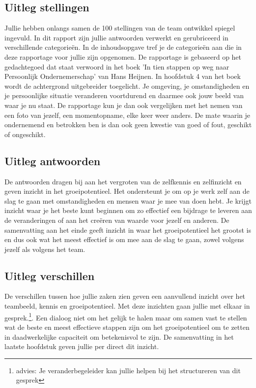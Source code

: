 \subsection{Uitleg stellingen}
Jullie hebben onlangs samen de 100 stellingen van de team ontwikkel spiegel ingevuld. In dit rapport zijn jullie antwoorden verwerkt en gerubriceerd in verschillende categorie\"en. In de inhoudsopgave tref je de categorie\"en aan die in deze rapportage voor jullie zijn opgenomen. De rapportage is gebaseerd op het gedachtegoed dat staat verwoord in het boek 'In tien stappen op weg naar Persoonlijk Ondernemerschap' van Hans Heijnen. In hoofdstuk 4 van het boek wordt de achtergrond uitgebreider toegelicht. Je omgeving, je omstandigheden en je persoonlijke situatie veranderen voortdurend en daarmee ook jouw beeld van waar je nu staat. De rapportage kun je dan ook vergelijken met het nemen van een foto van jezelf, een momentopname, elke keer weer anders. De mate waarin je ondernemend en betrokken ben is dan ook geen kwestie van goed of fout, geschikt of ongeschikt.
\subsection{Uitleg antwoorden}
De antwoorden dragen bij aan het vergroten van de zelfkennis en zelfinzicht en geven inzicht in het groeipotentieel. Het ondersteunt je om op je werk zelf aan de slag te gaan met omstandigheden en mensen waar je mee van doen hebt. Je krijgt inzicht waar je het beste kunt beginnen om zo effectief een bijdrage te leveren aan de veranderingen of aan het cre\"eren van waarde voor jezelf en anderen. De samenvatting aan het einde geeft inzicht in waar het groeipotentieel het grootst is en dus ook wat het meest effectief is om mee aan de slag te gaan, zowel volgens jezelf als volgens het team.
\subsection{Uitleg verschillen}
De verschillen tussen hoe jullie zaken zien geven een aanvullend inzicht over het teambeeld, kennis en groeipotentieel. Met deze inzichten gaan jullie met elkaar in gesprek.\footnote{advies: Je veranderbegeleider kan jullie helpen bij het structureren van dit gesprek}. Een dialoog niet om het gelijk te halen maar om samen vast te stellen wat de beste en meest effectieve stappen zijn om het groeipotentieel om te zetten in daadwerkelijke capaciteit om betekenisvol te zijn. De samenvatting in het laatste hoofdstuk geven jullie per direct dit inzicht.
